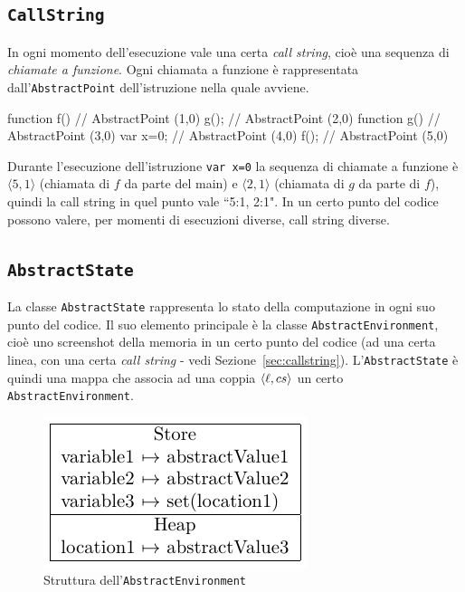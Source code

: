 \subsection{\texttt{CallString}}

In ogni momento dell'esecuzione vale una certa \emph{call string}, cioè una sequenza di \emph{chiamate a funzione}. Ogni chiamata a funzione è rappresentata dall'\texttt{AbstractPoint} dell'istruzione nella quale avviene. 

\begin{javascriptcode}
function f() {       // AbstractPoint (1,0)
    g();     }       // AbstractPoint (2,0)
function g() {       // AbstractPoint (3,0)
    var x=0; }       // AbstractPoint (4,0)
f();                 // AbstractPoint (5,0)
\end{javascriptcode}

Durante l'esecuzione dell'istruzione \texttt{var x=0} la sequenza di chiamate a funzione è $\langle 5,1\rangle$ (chiamata di $f$ da parte del main) e $\langle 2,1\rangle$ (chiamata di $g$ da parte di $f$), quindi la call string in quel punto vale \textsf{``5:1, 2:1"}. In un certo punto del codice possono valere, per momenti di esecuzioni diverse, call string diverse.

\subsection{\texttt{AbstractState}}

La classe \texttt{AbstractState} rappresenta lo stato della computazione in ogni suo punto del codice. Il suo elemento principale è la classe \texttt{AbstractEnvironment}, cioè uno screenshot della memoria in un certo punto del codice (ad una certa linea, con una certa \emph{call string} - vedi Sezione~\ref{sec:callstring}). L'\texttt{AbstractState} è quindi una mappa che associa ad una coppia $\langle \ell, cs \rangle$ un certo \texttt{AbstractEnvironment}.

\begin{figure}[htbp]
    \centering
    \includegraphics{scheme-generator/generated/environment.pdf}
    \caption{Struttura dell'\texttt{AbstractEnvironment}}
    \label{fig:realizzazione:abstractenvironment}
\end{figure}

